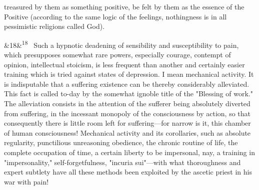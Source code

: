 \documentclass[12pt]{article}
\newcommand{\para}[1][]{\par\noindent\ifx&#1&\else\textsuperscript{\footnotesize #1}~\fi}
\begin{document}
treasured by them as something positive, be felt by them as the essence of the Positive (according to the same logic of the feelings, nothingness is in all pessimistic religions called God).

\para[18] Such a hypnotic deadening of sensibility and susceptibility to pain, which presupposes somewhat rare powers, especially courage, contempt of opinion, intellectual stoicism, is less frequent than another and certainly easier training which is tried against states of depression. I mean mechanical activity. It is indisputable that a suffering existence can be thereby considerably alleviated. This fact is called to-day by the somewhat ignoble title of the "Blessing of work." The alleviation consists in the attention of the sufferer being absolutely diverted from suffering, in the incessant monopoly of the consciousness by action, so that consequently there is little room left for suffering---for narrow is it, this chamber of human consciousness! Mechanical activity and its corollaries, such as absolute regularity, punctilious unreasoning obedience, the chronic routine of life, the complete occupation of time, a certain liberty to be impersonal, nay, a training in "impersonality," self-forgetfulness, "incuria sui"---with what thoroughness and expert subtlety have all these methods been exploited by the ascetic priest in his war with pain!
\end{document}

